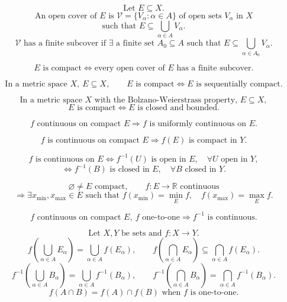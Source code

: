 \documentclass[11pt]{article}
\newcommand{\R}{\mathbb R}
\begin{document}


\[
\text{Let }E\subseteq X.
\]
\[
\text{An open cover of }E\text{ is }\mathcal V=\{V_\alpha:\alpha\in A\}
\text{ of open sets }V_\alpha\text{ in }X
\]
\[
\text{such that }E\subseteq \bigcup_{\alpha\in A}V_\alpha.
\]
\[
\mathcal V\text{ has a finite subcover if }\exists\text{ a finite set }A_0\subseteq A
\text{ such that }E\subseteq\bigcup_{\alpha\in A_0}V_\alpha.
\]

\[
E\text{ is compact}\Longleftrightarrow
\text{every open cover of }E\text{ has a finite subcover.}
\]

\[
\text{In a metric space }X,\ E\subseteq X,\qquad
E\text{ is compact}\Longleftrightarrow E\text{ is sequentially compact.}
\]

\[
\text{In a metric space }X\text{ with the Bolzano-Weierstrass property, }E\subseteq X,
\]
\[
E\text{ is compact}\Longleftrightarrow E\text{ is closed and bounded.}
\]

\[
f\text{ continuous on compact }E
\Longrightarrow f\text{ is uniformly continuous on }E.
\]

\[
f\text{ is continuous on compact }E
\Longrightarrow f(E)\text{ is compact in }Y.
\]

\[
f\text{ is continuous on }E
\Longleftrightarrow f^{-1}(U)\text{ is open in }E,\quad \forall U\text{ open in }Y,
\]
\[
\Longleftrightarrow f^{-1}(B)\text{ is closed in }E,\quad \forall B\text{ closed in }Y.
\]

\[
\varnothing\ne E\text{ compact},\qquad f:E\to\R\text{ continuous}
\]
\[
\Longrightarrow
\exists x_{\min},x_{\max}\in E
\text{ such that }f(x_{\min})=\min_E f,\quad f(x_{\max})=\max_E f.
\]

\[
f\text{ continuous on compact }E,\ f\text{ one-to-one}
\Longrightarrow f^{-1}\text{ is continuous.}
\]

\[
\text{Let }X,Y\text{ be sets and }f:X\to Y.
\]
\[
f\left(\bigcup_{\alpha\in A}E_\alpha\right)=\bigcup_{\alpha\in A}f(E_\alpha),
\qquad
f\left(\bigcap_{\alpha\in A}E_\alpha\right)\subseteq\bigcap_{\alpha\in A}f(E_\alpha).
\]
\[
f^{-1}\left(\bigcup_{\alpha\in A}B_\alpha\right)=\bigcup_{\alpha\in A}f^{-1}(B_\alpha),
\qquad
f^{-1}\left(\bigcap_{\alpha\in A}B_\alpha\right)=\bigcap_{\alpha\in A}f^{-1}(B_\alpha).
\]
\[
f(A\cap B)=f(A)\cap f(B)\text{ when }f\text{ is one-to-one.}
\]
\end{document}
